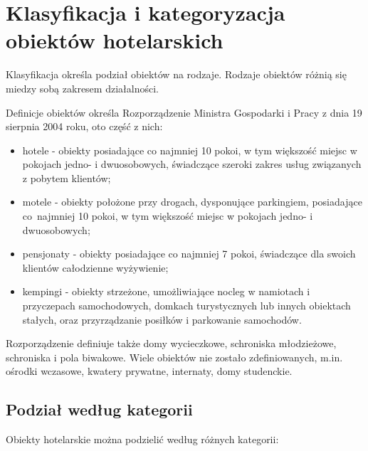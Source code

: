 \documentclass[a4paper,onecolumn,oneside,11pt,wide,floatssmall]{mwrep}
\theoremstyle{definition}
\theoremstyle{plain}%
\theoremstyle{remark}
\begin{document}
\section{Klasyfikacja i kategoryzacja obiektów hotelarskich}
Klasyfikacja określa podział obiektów na rodzaje. Rodzaje obiektów różnią 
się miedzy sobą zakresem działalności.

Definicje obiektów określa Rozporządzenie Ministra Gospodarki i Pracy z dnia 
19 sierpnia 2004 roku, oto część z nich:

\begin{itemize}
  \item hotele - obiekty posiadające co najmniej 10 pokoi, w tym większość 
  miejsc w pokojach jedno- i dwuosobowych, świadczące szeroki zakres usług 
  związanych z pobytem klientów;
  \item motele - obiekty położone przy drogach, dysponujące parkingiem, 
  posiadające \mbox{co najmniej} 10 pokoi, w tym większość miejsc w pokojach jedno- 
  i dwuosobowych;
  \item pensjonaty - obiekty posiadające co najmniej 7 pokoi, świadczące dla 
  swoich klientów całodzienne wyżywienie;
  \item kempingi - obiekty strzeżone, umożliwiające nocleg w namiotach i 
  przyczepach samochodowych, domkach turystycznych lub innych obiektach 
  stałych, oraz przyrządzanie posiłków i parkowanie samochodów.
\end{itemize}

Rozporządzenie definiuje także domy wycieczkowe, schroniska młodzieżowe, 
schroniska i pola biwakowe. Wiele obiektów nie zostało zdefiniowanych, m.in. 
ośrodki wczasowe, kwatery prywatne, internaty, domy studenckie.


\subsection{Podział według kategorii} 
Obiekty hotelarskie można podzielić według różnych kategorii\cite[15-16]{
KlasKatZakHot}:
\end{document}

